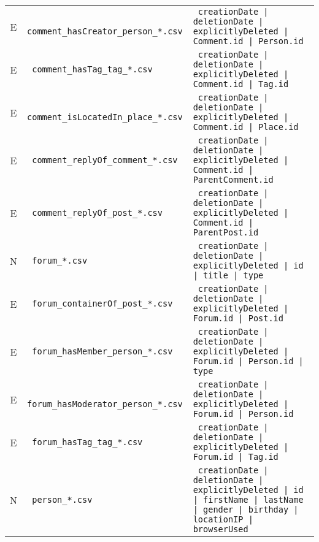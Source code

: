 \begin{table}[htb]
\begin{tabularx}{\linewidth}{|>{\sffamily}c|>{\tt}l|>{\tt}X|}
        E                    & comment\_hasCreator\_person\_*.csv      & creationDate | deletionDate | explicitlyDeleted | Comment.id | Person.id                                                             \\
        E                    & comment\_hasTag\_tag\_*.csv             & creationDate | deletionDate | explicitlyDeleted | Comment.id | Tag.id                                                                \\
        E                    & comment\_isLocatedIn\_place\_*.csv      & creationDate | deletionDate | explicitlyDeleted | Comment.id | Place.id                                                              \\
        E                    & comment\_replyOf\_comment\_*.csv        & creationDate | deletionDate | explicitlyDeleted | Comment.id | ParentComment.id                                                      \\
        E                    & comment\_replyOf\_post\_*.csv           & creationDate | deletionDate | explicitlyDeleted | Comment.id | ParentPost.id                                                         \\
        \hline
        N                    & forum\_*.csv                            & creationDate | deletionDate | explicitlyDeleted | id | title | type                                                                  \\
        E                    & forum\_containerOf\_post\_*.csv         & creationDate | deletionDate | explicitlyDeleted | Forum.id | Post.id                                                                 \\
        E                    & forum\_hasMember\_person\_*.csv         & creationDate | deletionDate | explicitlyDeleted | Forum.id | Person.id | type                                                        \\
        E                    & forum\_hasModerator\_person\_*.csv      & creationDate | deletionDate | explicitlyDeleted | Forum.id | Person.id                                                               \\
        E                    & forum\_hasTag\_tag\_*.csv               & creationDate | deletionDate | explicitlyDeleted | Forum.id | Tag.id                                                                  \\
        \hline
        N                    & person\_*.csv                           & creationDate | deletionDate | explicitlyDeleted | id | firstName | lastName | gender | birthday | locationIP | browserUsed           \\

\end{tabularx}
\end{table}

